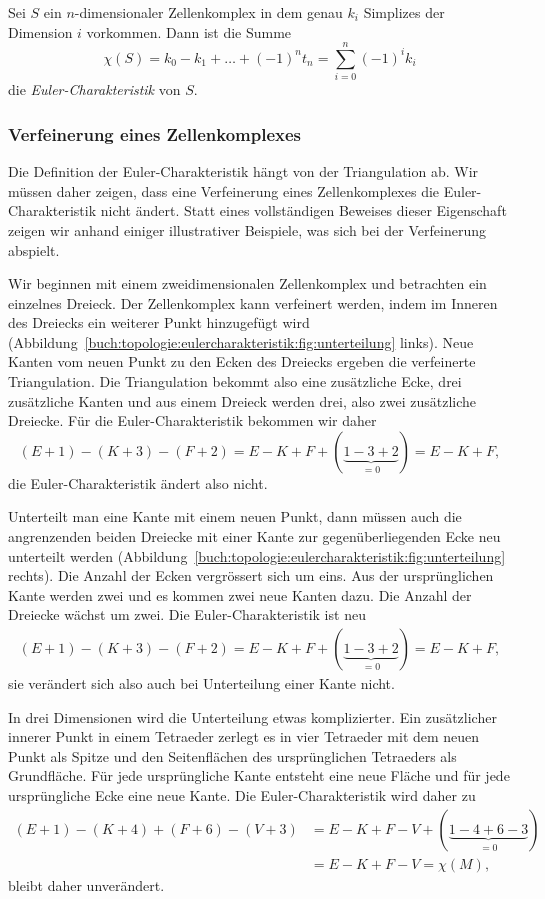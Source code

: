 \begin{definition}
Sei $S$ ein $n$-dimensionaler Zellenkomplex in dem
genau $k_i$ Simplizes der Dimension $i$ vorkommen.
Dann ist die Summe
\[
\chi(S)
=
k_0 - k_1 + \dots + (-1)^n t_n
=
\sum_{i=0}^n (-1)^i k_i
\]
die \emph{Euler-Charakteristik} von $S$.
%
\end{definition}

%
%
\subsubsection{Verfeinerung eines Zellenkomplexes}
Die Definition der Euler-Charakteristik hängt von der Triangulation ab.
Wir müssen daher zeigen, dass eine Verfeinerung eines Zellenkomplexes die
Euler-Charakteristik nicht ändert.
Statt eines vollständigen Beweises dieser Eigenschaft zeigen wir anhand
einiger illustrativer Beispiele, was sich bei der Verfeinerung
abspielt.
%

Wir beginnen mit einem zweidimensionalen Zellenkomplex
und betrachten ein einzelnes Dreieck.
Der Zellenkomplex kann verfeinert werden, indem im Inneren des
Dreiecks ein weiterer Punkt hinzugefügt wird
(Abbildung~\ref{buch:topologie:eulercharakteristik:fig:unterteilung} links).
Neue Kanten vom neuen Punkt zu den Ecken des Dreiecks ergeben die
verfeinerte Triangulation.
Die Triangulation bekommt also eine zusätzliche Ecke, drei zusätzliche
Kanten und aus einem Dreieck werden drei, also zwei zusätzliche Dreiecke.
Für die Euler-Charakteristik bekommen wir daher
\[
(E+1) - (K+3) - (F+2)
=
E-K+F+(\underbrace{1-3+2}_{\displaystyle=0})
=
E-K+F,
\]
die Euler-Charakteristik ändert also nicht.

Unterteilt man eine Kante mit einem neuen Punkt, dann müssen auch
die angrenzenden beiden Dreiecke mit einer Kante zur gegenüberliegenden
Ecke neu unterteilt werden
(Abbildung~\ref{buch:topologie:eulercharakteristik:fig:unterteilung} rechts).
Die Anzahl der Ecken vergrössert sich um eins.
Aus der ursprünglichen Kante werden zwei und es kommen zwei neue Kanten
dazu.
Die Anzahl der Dreiecke wächst um zwei.
Die Euler-Charakteristik ist neu
\begin{align*}
(E+1) - (K+3) - (F+2)
=
E-K+F +(\underbrace{1-3+2}_{\displaystyle=0})
=
E-K+F,
\end{align*}
sie verändert sich also auch bei Unterteilung einer Kante nicht.

In drei Dimensionen wird die Unterteilung etwas komplizierter.
Ein zusätzlicher innerer Punkt in einem Tetraeder zerlegt
es in vier Tetraeder mit dem neuen Punkt als Spitze und den
Seitenflächen des ursprünglichen Tetraeders als Grundfläche.
Für jede ursprüngliche Kante entsteht eine neue Fläche und
für jede ursprüngliche Ecke eine neue Kante.
Die Euler-Charakteristik wird daher zu
\begin{align*}
(E+1) - (K+4) + (F+6) - (V+3)
&=
E-K+F-V
+
(\underbrace{1-4+6-3}_{\displaystyle=0})
\\
&=
E-K+F-V
=
\chi(M),
\end{align*}
bleibt daher unverändert.

